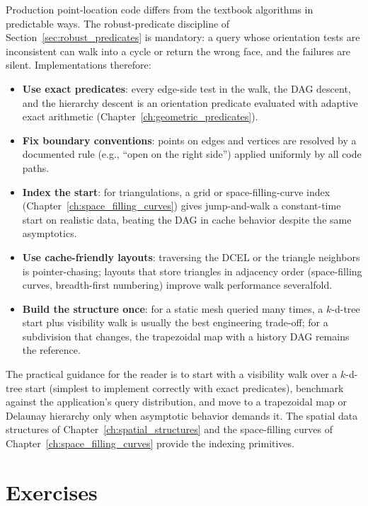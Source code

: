 Production point-location code differs from the textbook algorithms in
predictable ways. The robust-predicate discipline of
Section~\ref{sec:robust_predicates} is mandatory: a query whose
orientation tests are inconsistent can walk into a cycle or return the
wrong face, and the failures are silent. Implementations therefore:

\begin{itemize}
\item \textbf{Use exact predicates}: every edge-side test in the walk, the
  DAG descent, and the hierarchy descent is an orientation predicate
  evaluated with adaptive exact arithmetic (Chapter~\ref{ch:geometric_predicates}).
\item \textbf{Fix boundary conventions}: points on edges and vertices are
  resolved by a documented rule (e.g., ``open on the right side'') applied
  uniformly by all code paths.
\item \textbf{Index the start}: for triangulations, a grid or
  space-filling-curve index (Chapter~\ref{ch:space_filling_curves}) gives
  jump-and-walk a constant-time start on realistic data, beating the DAG in
  cache behavior despite the same asymptotics.
\item \textbf{Use cache-friendly layouts}: traversing the DCEL or the
  triangle neighbors is pointer-chasing; layouts that store triangles in
  adjacency order (space-filling curves, breadth-first numbering) improve
  walk performance severalfold.
\item \textbf{Build the structure once}: for a static mesh queried many
  times, a $k$-d-tree start plus visibility walk is usually the best
  engineering trade-off; for a subdivision that changes, the trapezoidal
  map with a history DAG remains the reference.
\end{itemize}

The practical guidance for the reader is to start with a visibility walk
over a $k$-d-tree start (simplest to implement correctly with exact
predicates), benchmark against the application's query distribution, and
move to a trapezoidal map or Delaunay hierarchy only when asymptotic
behavior demands it. The spatial data structures of
Chapter~\ref{ch:spatial_structures} and the space-filling curves of
Chapter~\ref{ch:space_filling_curves} provide the indexing primitives.


\section{Exercises}
\label{sec:pointloc_exercises}

